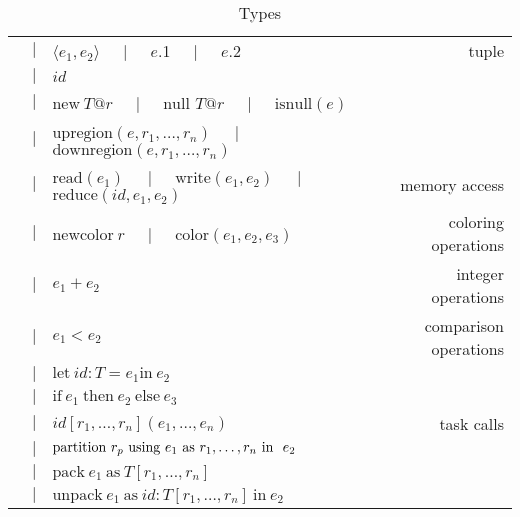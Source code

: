 \begin{table*}
{\begin{tabular}{cclr}
  &$\mid$& $\langle e_1, e_2 \rangle$ $\;\;\;\mid\;\;\;$ $e$.1 $\;\;\;\mid\;\;\;$ $e$.2 & tuple \\
  &$\mid$& $id$ &  \\
  &$\mid$& $\text{new}\ T@r$ $\;\;\;\mid\;\;\;$ $\text{null }T@r$ $\;\;\;\mid\;\;\;$ $\text{isnull}(e)$ & \\
  &$\mid$& $\text{upregion}(e, r_1,\ldots,r_n)$ $\;\;\;\mid\;\;\;$ $\text{downregion}(e, r_1,\ldots,r_n)$ & \\
  &$\mid$& $\text{read}(e_1)$ $\;\;\;\mid\;\;\;$ $\text{write}(e_1, e_2)$ $\;\;\;\mid\;\;\;$ $\text{reduce}(id, e_1, e_2)$ & memory access \\
  &$\mid$& $\text{newcolor}\ r$ $\;\;\;\mid\;\;\;$ $\text{color}(e_1, e_2, e_3)$ & coloring operations \\
  &$\mid$& $e_1 + e_2$ & integer operations \\
  &$\mid$& $e_1 < e_2$ & comparison operations \\
  &$\mid$& $\text{let}\ id : T = e_1 \text{in}\ e_2$ &  \\
  &$\mid$& $\text{if}\ e_1\ \text{then}\ e_2\ \text{else}\ e_3$ &  \\
  &$\mid$& $id[r_1, \ldots, r_n](e_1,\ldots,e_n)$ & task calls \\
  &$\mid$& $\text{partition}\ r_p\text{ using }e_1\text{ as }{r}_1,\ldots,{r}_n\text{ in }\ e_2$ &  \\
  &$\mid$& $\text{pack}\ e_1\ \text{as}\ T[r_1,\ldots,r_n]$ &  \\
  &$\mid$& $\text{unpack}\ e_1\ \text{as}\ id : T[r_1,\ldots,r_n]\ \text{in}\ e_2$ &  \\

\end{tabular}
}
\caption{Types}
\end{table*}

\newcommand{\cinfrule}[3]{\parbox{14cm}{\hfil$\infrule{#1}{#2}$\hfil}\parbox{4cm}{$\,#3$\hfil}}
\newcommand{\finfrule}[2]{\vspace{10pt}\framebox{$\infrule{#1}{#2}$}\vspace{10pt}}

\newcommand{\infx}[2]{\infrule{\begin{array}{l}{#1}\end{array}}{#2}}

\newcommand{\regionexpand}[0]{[r'_1/r_1, \ldots, r'_n/r_n]}
\newcommand{\rtriple}[3]{\left({#1},{#2},{#3}\right)}
\newcommand{\rsingle}[1]{\rtriple{#1}{\emptyset}{\top}}
\newcommand{\rtripsub}[3]{\rtriple{#1}{\Phi_{#2}}{C_{#3}}}
\newcommand{\envsub}[2]{\Gamma, \Phi_{#1}, C_{#2} \vdash}
\newcommand{\typeenv}[0]{\Gamma, \Phi, \Omega \vdash}

